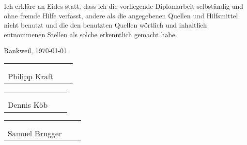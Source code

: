 Ich erkläre an Eides statt, dass ich die vorliegende Diplomarbeit selbständig und ohne fremde Hilfe verfasst, andere als die angegebenen Quellen und Hilfsmittel nicht benutzt und die den benutzten Quellen wörtlich und inhaltlich entnommenen Stellen als solche erkenntlich gemacht habe.

\vspace*{1cm}
Rankweil, \today

\vspace*{2cm}


\begin{center}
\begin{tabular}{cp{2em}c} 
  \hspace{6cm} \\\cline{1-1}\cline{3-3}
  \\[-3mm]
  {\footnotesize Philipp Kraft}
\end{tabular}

\vspace*{1cm}

\begin{tabular}{cp{2em}c} 
  \hspace{6cm} \\\cline{1-1}\cline{3-3}
  \\[-3mm]
  {\footnotesize Dennis Köb}
\end{tabular}

\vspace*{1cm}

\begin{tabular}{cp{2em}c} 
  \hspace{6cm} \\\cline{1-1}\cline{3-3}
  \\[-3mm]
  {\footnotesize Samuel Brugger}
\end{tabular}

\end{center}

\cleardoublepage

